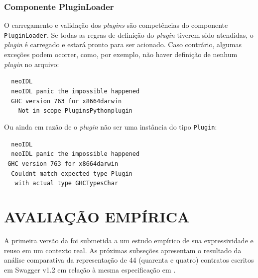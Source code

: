 \subsubsection{Componente PluginLoader}
\label{compPluginLoader}

O carregamento e validação dos \textit{plugins} são competências do componente
\texttt{PluginLoader}. Se todas as regras de definição do \textit{plugin}
tiverem sido atendidas, o \textit{plugin} é carregado e estará pronto para ser
 acionado. Caso contrário, algumas exceções podem ocorrer, como, por exemplo, não haver definição de
nenhum \textit{plugin} no arquivo:
\vspace{-6mm}

\begin{tabbing}\tt
~neoIDL\\
\tt
~neoIDL~panic~the~impossible~happened\\
\tt ~~GHC~version~763~for~x8664darwin\\
\tt ~~~~Not~in~scope~PluginsPythonplugin
\end{tabbing}
\vspace{-6mm}

Ou ainda em razão de o \textit{plugin} não ser uma instância do tipo
\texttt{Plugin}:

\vspace{-6mm}
\begin{tabbing}\tt
~neoIDL\\
\tt
~neoIDL~panic~the~impossible~happened\\
\tt ~GHC~version~763~for~x8664darwin\\
\tt ~~Couldnt~match~expected~type~Plugin\\
\tt ~~~with~actual~type~GHCTypesChar
\end{tabbing}


\section{AVALIAÇÃO EMPÍRICA}
\label{EstudoExpressividadeReuso}
\vspace{-6mm}

A primeira versão da \neoidl{} foi submetida a um estudo empírico de sua expressividade 
e reuso em um contexto real. As próximas subseções apresentam 
o resultado da análise comparativa da representação de 44 (quarenta e quatro)
contratos escritos em Swagger v1.2 em relação à mesma especificação em
\neoidl{}.

